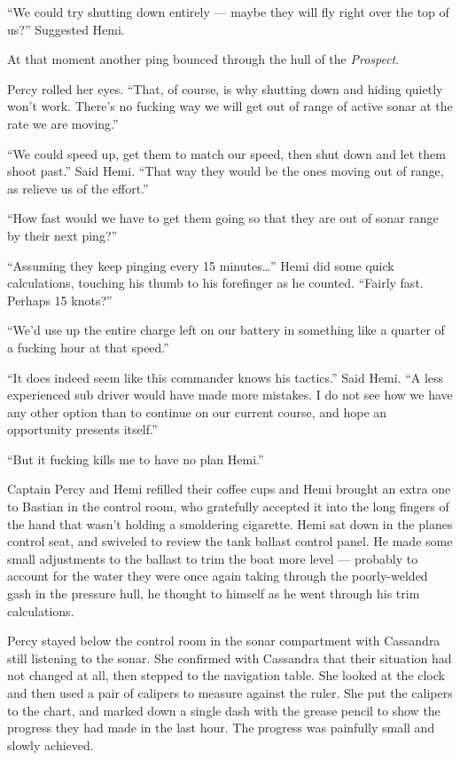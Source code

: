 \documentclass[]{scrbook}
\begin{document}
``We could try shutting down entirely --- maybe they will fly right over
the top of us?'' Suggested Hemi.

At that moment another ping bounced through the hull of the
\emph{Prospect}.

Percy rolled her eyes. ``That, of course, is why shutting down and
hiding quietly won't work. There's no fucking way we will get out of
range of active sonar at the rate we are moving.''

``We could speed up, get them to match our speed, then shut down and let
them shoot past.'' Said Hemi. ``That way they would be the ones moving
out of range, as relieve us of the effort.''

``How fast would we have to get them going so that they are out of sonar
range by their next ping?''

``Assuming they keep pinging every 15 minutes\ldots{}'' Hemi did some
quick calculations, touching his thumb to his forefinger as he counted.
``Fairly fast. Perhaps 15 knots?''

``We'd use up the entire charge left on our battery in something like a
quarter of a fucking hour at that speed.''

``It does indeed seem like this commander knows his tactics.'' Said
Hemi. ``A less experienced sub driver would have made more mistakes. I
do not see how we have any other option than to continue on our current
course, and hope an opportunity presents itself.''

``But it fucking kills me to have no plan Hemi.''

Captain Percy and Hemi refilled their coffee cups and Hemi brought an
extra one to Bastian in the control room, who gratefully accepted it
into the long fingers of the hand that wasn't holding a smoldering
cigarette. Hemi sat down in the planes control seat, and swiveled to
review the tank ballast control panel. He made some small adjustments to
the ballast to trim the boat more level --- probably to account for the
water they were once again taking through the poorly-welded gash in the
pressure hull, he thought to himself as he went through his trim
calculations.

Percy stayed below the control room in the sonar compartment with
Cassandra still listening to the sonar. She confirmed with Cassandra
that their situation had not changed at all, then stepped to the
navigation table. She looked at the clock and then used a pair of
calipers to measure against the ruler. She put the calipers to the
chart, and marked down a single dash with the grease pencil to show the
progress they had made in the last hour. The progress was painfully
small and slowly achieved.
\end{document}
